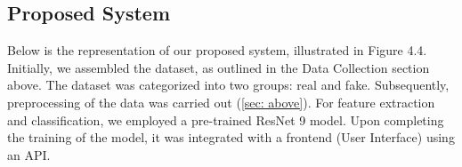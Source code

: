         \subsection{Proposed System}
        Below is the representation of our proposed system, illustrated in Figure 4.4. Initially, we assembled the dataset, as outlined in the Data Collection section above. The dataset was categorized into two groups: real and fake. Subsequently, preprocessing of the data was carried out (\ref{sec: above}). For feature extraction and classification, we employed a pre-trained ResNet 9 model. Upon completing the training of the model, it was integrated with a frontend (User Interface) using an API.
        \vspace{20pt}
        \begin{figure}[hbt!]
        \end{figure}
        
